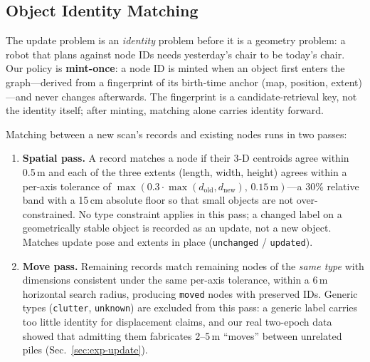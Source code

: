 \subsection{Object Identity Matching}
\label{sec:matching}

The update problem is an \emph{identity} problem before it is a geometry
problem: a robot that plans against node IDs needs yesterday's chair to be
today's chair. Our policy is \textbf{mint-once}: a node ID is minted when an
object first enters the graph---derived from a fingerprint of its birth-time
anchor (map, position, extent)---and never changes afterwards. The
fingerprint is a candidate-retrieval key, not the identity itself; after
minting, matching alone carries identity forward.

Matching between a new scan's records and existing nodes runs in two passes:

\begin{enumerate}
\item \textbf{Spatial pass.} A record matches a node if their 3-D centroids
agree within 0.5\,m and each of the three extents (length, width, height)
agrees within a per-axis tolerance of $\max(0.3\cdot
\max(d_{\mathrm{old}},d_{\mathrm{new}}),\,0.15\,\mathrm{m})$---a 30\%
relative band with a 15\,cm absolute floor so that small objects are not
over-constrained. No type constraint applies in this pass; a changed label
on a geometrically stable object is recorded as an update, not a new
object. Matches update pose and extents in place (\texttt{unchanged} /
\texttt{updated}).
\item \textbf{Move pass.} Remaining records match remaining nodes of the
\emph{same type} with dimensions consistent under the same per-axis
tolerance, within a 6\,m horizontal search radius,
producing \texttt{moved} nodes with preserved IDs. Generic types
(\texttt{clutter}, \texttt{unknown}) are excluded from this pass: a generic
label carries too little identity for displacement claims, and our real
two-epoch data showed that admitting them fabricates 2--5\,m
``moves'' between unrelated piles (Sec.~\ref{sec:exp-update}).
\end{enumerate}

